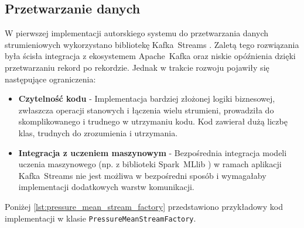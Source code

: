 \subsection{Przetwarzanie danych}

W pierwszej implementacji autorskiego systemu do przetwarzania danych strumieniowych wykorzystano bibliotekę \mbox{Kafka Streams} \cite{kafka_streams}. Zaletą tego rozwiązania była ścisła integracja z ekosystemem \mbox{Apache Kafka} \cite{kafka} oraz niskie opóźnienia dzięki przetwarzaniu rekord po rekordzie. Jednak w trakcie rozwoju pojawiły się następujące ograniczenia:
\begin{itemize}
    \item \textbf{Czytelność kodu} - Implementacja bardziej złożonej logiki biznesowej, zwłaszcza operacji stanowych i łączenia wielu strumieni, prowadziła do skomplikowanego i trudnego w utrzymaniu kodu. Kod zawierał dużą liczbę klas, trudnych do zrozumienia i utrzymania.
    \item \textbf{Integracja z uczeniem maszynowym} - Bezpośrednia integracja modeli uczenia maszynowego (np. z biblioteki \mbox{Spark MLlib} \cite{spark_mllib_reference}) w ramach aplikacji \mbox{Kafka Streams} nie jest możliwa w bezpośredni sposób i wymagałaby implementacji dodatkowych warstw komunikacji.
\end{itemize}

Poniżej \ref{lst:pressure_mean_stream_factory} przedstawiono przykładowy kod implementacji w klasie \texttt{PressureMeanStreamFactory}.

